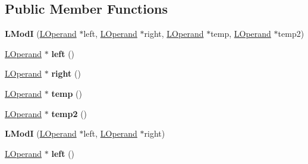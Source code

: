 \subsection*{Public Member Functions}
\begin{DoxyCompactItemize}
\item 
{\bfseries L\+ModI} (\hyperlink{classv8_1_1internal_1_1_l_operand}{L\+Operand} $\ast$left, \hyperlink{classv8_1_1internal_1_1_l_operand}{L\+Operand} $\ast$right, \hyperlink{classv8_1_1internal_1_1_l_operand}{L\+Operand} $\ast$temp, \hyperlink{classv8_1_1internal_1_1_l_operand}{L\+Operand} $\ast$temp2)\hypertarget{classv8_1_1internal_1_1_l_mod_i_a59ad5595571919940be442e9d613f004}{}\label{classv8_1_1internal_1_1_l_mod_i_a59ad5595571919940be442e9d613f004}

\item 
\hyperlink{classv8_1_1internal_1_1_l_operand}{L\+Operand} $\ast$ {\bfseries left} ()\hypertarget{classv8_1_1internal_1_1_l_mod_i_a4b97251c08cb973560861f2c7cbe18ea}{}\label{classv8_1_1internal_1_1_l_mod_i_a4b97251c08cb973560861f2c7cbe18ea}

\item 
\hyperlink{classv8_1_1internal_1_1_l_operand}{L\+Operand} $\ast$ {\bfseries right} ()\hypertarget{classv8_1_1internal_1_1_l_mod_i_a1cf38930a4ba82683054b45ea0790c91}{}\label{classv8_1_1internal_1_1_l_mod_i_a1cf38930a4ba82683054b45ea0790c91}

\item 
\hyperlink{classv8_1_1internal_1_1_l_operand}{L\+Operand} $\ast$ {\bfseries temp} ()\hypertarget{classv8_1_1internal_1_1_l_mod_i_a61433c24a5b1830ed8577adedbc066b5}{}\label{classv8_1_1internal_1_1_l_mod_i_a61433c24a5b1830ed8577adedbc066b5}

\item 
\hyperlink{classv8_1_1internal_1_1_l_operand}{L\+Operand} $\ast$ {\bfseries temp2} ()\hypertarget{classv8_1_1internal_1_1_l_mod_i_a72ed5c13677eae1a687d6685801204f6}{}\label{classv8_1_1internal_1_1_l_mod_i_a72ed5c13677eae1a687d6685801204f6}

\item 
{\bfseries L\+ModI} (\hyperlink{classv8_1_1internal_1_1_l_operand}{L\+Operand} $\ast$left, \hyperlink{classv8_1_1internal_1_1_l_operand}{L\+Operand} $\ast$right)\hypertarget{classv8_1_1internal_1_1_l_mod_i_a9071f2c8d9c855e3454d9d344a4f231e}{}\label{classv8_1_1internal_1_1_l_mod_i_a9071f2c8d9c855e3454d9d344a4f231e}

\item 
\hyperlink{classv8_1_1internal_1_1_l_operand}{L\+Operand} $\ast$ {\bfseries left} ()\hypertarget{classv8_1_1internal_1_1_l_mod_i_a4b97251c08cb973560861f2c7cbe18ea}{}\label{classv8_1_1internal_1_1_l_mod_i_a4b97251c08cb973560861f2c7cbe18ea}


\end{DoxyCompactItemize}
